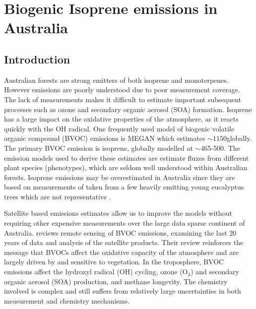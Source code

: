 
%
%



\chapter{Biogenic Isoprene emissions in Australia} %
\label{BioIsop}
  
\section{Introduction}  
\label{BioIsop:intro}  
  
  
  
  Australian forests are strong emitters of both isoprene and monoterpenes.
  However emissions are poorly understood due to poor measurement coverage.
  The lack of measurements makes it difficult to estimate important subsequent processes such as ozone and secondary organic aerosol (SOA) formation.
  Isoprene has a large impact on the oxidative properties of the atmosphere, as it reacts quickly with the OH radical.
  One frequently used model of biogenic volatile organic compound (BVOC) emissions is MEGAN \parencite{Guenther2000} which estimates $\sim 1150$\tgpyr globally.
  The primary BVOC emission is isoprene, globally modelled at $\sim$465-500\tgcpyr \parencite{Guenther2006, Messina2016}. 
  The emission models used to derive these estimates are estimate fluxes from different plant species (phenotypes), which are seldom well understood within Australian forests.
  Isoprene emissions may be overestimated in Australia since they are based on measurements of taken from a few heavily emitting young eucalyptus trees which are not representative \parencite{Winters2009, FortemsCheiney2012,}.
  
  Satellite based emissions estimates allow us to improve the models without requiring other expensive measurements over the large data sparse continent of Australia.
  \textcite{Kefauver2014} reviews remote sensing of BVOC emissions, examining the last 20 years of data and analysis of the satellite products.
  Their review reinforces the message that BVOCs affect the oxidative capacity of the atmosphere and are largely driven by and sensitive to vegetation.
  In the troposphere, BVOC emissions affect the hydroxyl radical (OH) cycling, ozone (O$_3$) and secondary organic aerosol (SOA) production, and methane longevity.
  The chemistry involved is complex and still suffers from relatively large uncertainties in both measurement and chemistry mechanisms.
  
